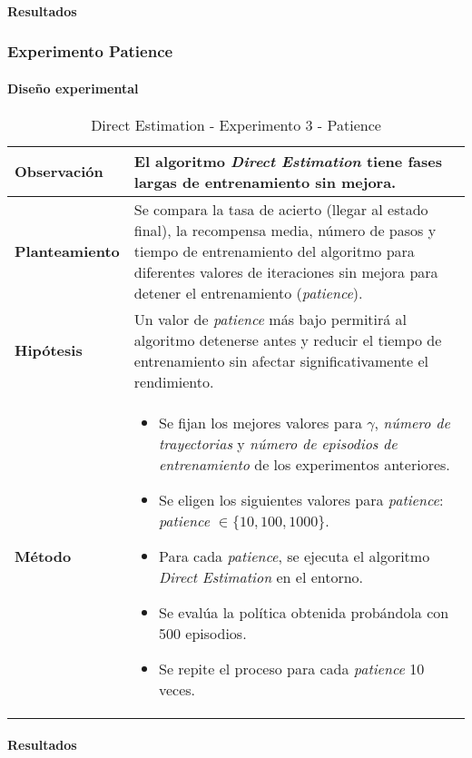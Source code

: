 \paragraph{Resultados}

\subsubsection{Experimento Patience}

\paragraph{Diseño experimental}

\begin{table}[H]
    \centering
    \begin{tabularx}{\textwidth}{|p{4cm}|X|} %
        \hline %
        \textbf{Observación} & El algoritmo \textit{Direct Estimation} tiene fases largas de entrenamiento sin mejora.
        \\ \hline
        \textbf{Planteamiento} & Se compara la tasa de acierto (llegar al estado final), la recompensa media, número de pasos y tiempo de entrenamiento del algoritmo para diferentes valores de iteraciones sin mejora para detener el entrenamiento (\textit{patience}).
        \\ \hline
        \textbf{Hipótesis} & Un valor de \textit{patience} más bajo permitirá al algoritmo detenerse antes y reducir el tiempo de entrenamiento sin afectar significativamente el rendimiento.
        \\ \hline
        \textbf{Método} & 
        \begin{itemize}
            \item Se fijan los mejores valores para \(\gamma\), \textit{número de trayectorias} y \textit{número de episodios de entrenamiento} de los experimentos anteriores.
            \item Se eligen los siguientes valores para \textit{patience}: \textit{patience} \(\in \{10, 100, 1000\}\).
            \item Para cada \textit{patience}, se ejecuta el algoritmo \textit{Direct Estimation} en el entorno.
            \item Se evalúa la política obtenida probándola con 500 episodios.
            \item Se repite el proceso para cada \textit{patience} 10 veces.
        \end{itemize}
        \\ \hline
    \end{tabularx}
    \caption{Direct Estimation - Experimento 3 - Patience}
    \label{tab:diseñoDirectEstimationExp3}
\end{table}

\paragraph{Resultados}